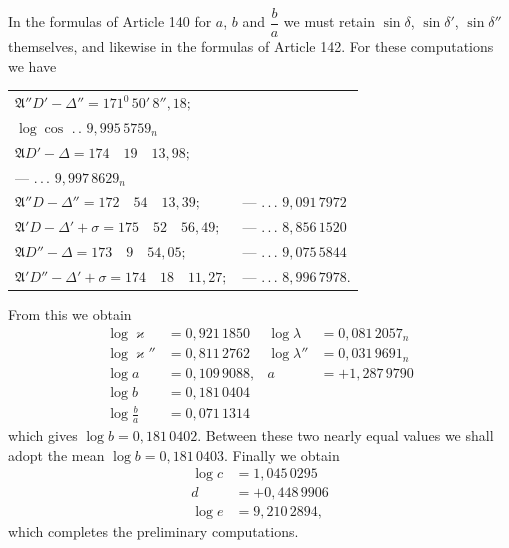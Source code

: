 In the formulas of Article 140 for $a$, $b$ and $\dfrac b a$ we must retain $\sin\delta$, $\sin\delta'$, $\sin\delta''$ themselves, and likewise in the formulas of Article 142. For these computations we have
\begin{center}\begingroup\footnotesize\setlength{\tabcolsep}{4pt}\renewcommand{\arraystretch}{1.3}
\begin{tabular}{ll}
$\mathfrak A''D'-\Delta''=171^0\,50'\,8''{,}18;$ & \shortstack{$\log\sin$ .\,.\,. $9{,}152\,3306;$\\$\log\cos$ .\,. $9{,}995\,5759_n$}\\
$\mathfrak AD'-\Delta=174\quad19\quad13{,}98;$ & \shortstack{--- .\,.\,. $8{,}995\,4722;$\\--- .\,.\,. $9{,}997\,8629_n$}\\
$\mathfrak A''D-\Delta''=172\quad54\quad13{,}39;$ & --- .\,.\,. $9{,}091\,7972$\\
$\mathfrak A'D-\Delta'+\sigma=175\quad52\quad56{,}49;$ & --- .\,.\,. $8{,}856\,1520$\\
$\mathfrak AD''-\Delta=173\quad9\quad54{,}05;$ & --- .\,.\,. $9{,}075\,5844$\\
$\mathfrak A'D''-\Delta'+\sigma=174\quad18\quad11{,}27;$ & --- .\,.\,. $8{,}996\,7978$.
\end{tabular}\endgroup\end{center}
\noindent From this we obtain
\[
\begin{aligned}
\log\varkappa&=0{,}921\,1850&\log\lambda&=0{,}081\,2057_n\\
\log\varkappa''&=0{,}811\,2762&\log\lambda''&=0{,}031\,9691_n\\
\log a&=0{,}109\,9088,&a&=+1{,}287\,9790\\
\log b&=0{,}181\,0404&&\\
\log\frac b a&=0{,}071\,1314&&
\end{aligned}
\]
\noindent which gives $\log b=0{,}181\,0402$. Between these two nearly equal values we shall adopt the mean $\log b=0{,}181\,0403$. Finally we obtain
\[
\begin{aligned}
\log c&=1{,}045\,0295\\
d&=+0{,}448\,9906\\
\log e&=9{,}210\,2894,
\end{aligned}
\]
\noindent which completes the preliminary computations.

